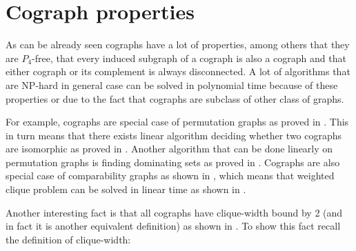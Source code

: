 
\section{Cograph properties}

As can be already seen cographs have a lot of properties, among others that they are $P_4$-free, that every induced subgraph of a cograph is also a cograph and that either cograph or its complement is always disconnected. A lot of algorithms that are NP-hard in general case can be solved in polynomial time because of these properties or due to the fact that cographs are subclass of other class of graphs.

For example, cographs are special case of permutation graphs as proved in \cite{bose}. This in turn means that there exists linear algorithm deciding whether two cographs are isomorphic as proved in \cite{colbourn}. Another algorithm that can be done linearly on permutation graphs is finding dominating sets as proved in \cite{chao}. Cographs are also special case of comparability graphs as shown in \cite{jung}, which means that weighted clique problem can be solved in linear time as shown in \cite{golumbic}.

Another interesting fact is that all cographs have clique-width bound by 2 (and in fact it is another equivalent definition) as shown in \cite{courcelle}. To show this fact recall the definition of clique-width:

